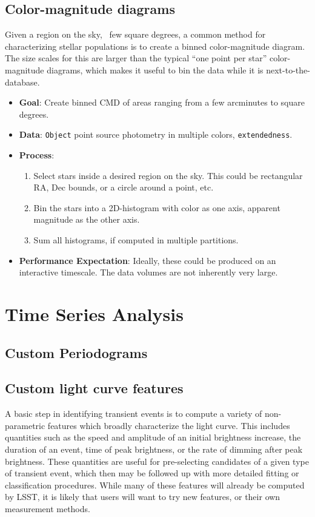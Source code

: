 \documentclass[DM,authoryear,toc]{lsstdoc}
\begin{document}
\subsection{Color-magnitude diagrams}

Given a region on the sky, ~few square degrees, a common method for characterizing
stellar populations is to create a binned color-magnitude diagram. The size
scales for this are larger than the typical ``one point per star''
color-magnitude diagrams, which makes it useful to bin the data while it is
next-to-the-database.

\begin{itemize}
  \item \textbf{Goal}: Create binned CMD of areas ranging from a few arcminutes
  to square degrees.
  \item \textbf{Data}: \texttt{Object} point source photometry in multiple
  colors, \texttt{extendedness}.
  \item \textbf{Process}:
    \begin{enumerate}
      \item Select stars inside a desired region on the sky. This could be
      rectangular RA, Dec bounds, or a circle around a point, etc.
      \item Bin the stars into a 2D-histogram with color as one axis, apparent
      magnitude as the other axis.
      \item Sum all histograms, if computed in multiple partitions.
    \end{enumerate}
  \item \textbf{Performance Expectation}: Ideally, these could be produced on an
  interactive timescale. The data volumes are not inherently very large.
\end{itemize}

\section{Time Series Analysis}

\subsection{Custom Periodograms}

\subsection{Custom light curve features}
\label{lc_features}

A basic step in identifying transient events is to compute a variety of
non-parametric features which broadly characterize the light curve. This
includes quantities such as the speed and amplitude of an initial brightness
increase, the duration of an event, time of peak brightness, or the rate of
dimming after peak brightness. These quantities are useful for pre-selecting
candidates of a given type of transient event, which then may be followed up
with more detailed fitting or classification procedures. While many of these
features will already be computed by LSST, it is likely that users will want to
try new features, or their own measurement methods.
\end{document}
